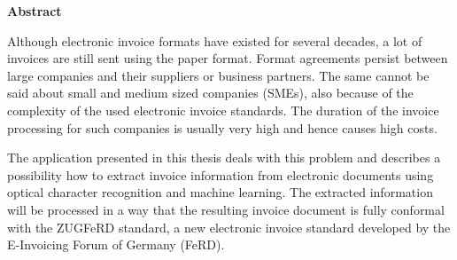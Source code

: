 \documentclass[english,mt]{lmedoc}
\begin{document}
\vspace{5.0cm}

\begin{center}
\bfseries
Abstract
\normalfont

Although electronic invoice formats have existed for several decades, a lot of invoices are still sent using the paper format. Format agreements persist between large companies and their suppliers or business partners. The same cannot be said about small and medium sized companies (SMEs), also because of the complexity of the used electronic invoice standards.
The duration of the invoice processing for such companies is usually very high and hence causes high costs.

The application presented in this thesis deals with this problem and describes a possibility how to extract invoice information from electronic documents using optical character recognition and machine learning. The extracted information will be processed in a way that the resulting invoice document is fully conformal with the ZUGFeRD standard, a new electronic invoice standard developed by the E-Invoicing Forum of Germany (FeRD). 
\end{center}

\cleardoublepage

\tableofcontents

\cleardoublepage {}
\end{document}
